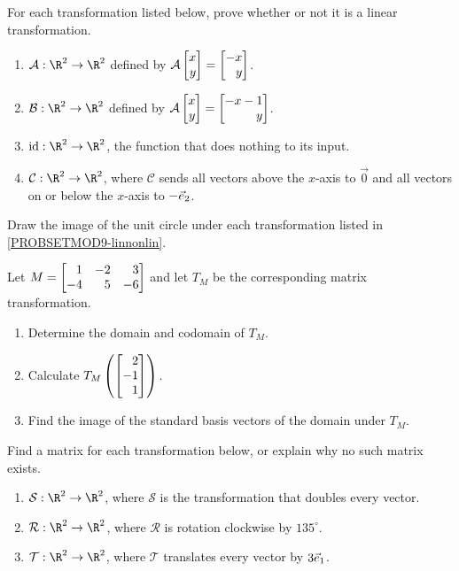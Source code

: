 \begin{exercises}
	\begin{problist}
		\prob For each transformation listed below, prove whether or not it is a linear transformation.
		\label{PROBSETMOD9-linnonlin}
		\begin{enumerate}
			\item $\mathcal A:\R^2\to\R^2$ defined by $\mathcal A\mat{x\\y}=\mat{-x\\y}$.
			\item $\mathcal B:\R^2\to\R^2$ defined by $\mathcal A\mat{x\\y}=\mat{-x-1\\y}$.
			\item $\Ident:\R^2\to\R^2$, the function that does nothing to its input.
			\item $\mathcal C:\R^2\to\R^2$, where $\mathcal C$ sends all vectors above the $x$-axis to $\vec 0$
				and all vectors on or below the $x$-axis to $-{\vec e_2}$.
		\end{enumerate}

		\prob Draw the image of the unit circle under each transformation listed in \ref{PROBSETMOD9-linnonlin}.

		\prob Let $M=\mat{1&-2&3\\-4&5&-6}$ and let $T_M$ be the corresponding matrix transformation.
		\begin{enumerate}
			\item Determine the domain and codomain of $T_M$.
			\item Calculate $T_M\left(\mat{2\\-1\\1}\right)$.
			\item Find the image of the standard basis vectors of the domain under $T_M$.
		\end{enumerate}

		\prob Find a matrix for each transformation below, or explain why no such matrix exists.
		\begin{enumerate}
			\item $\mathcal S:\R^{2}\to\R^{2}$, where $\mathcal S$ is the
				transformation that doubles every vector.

			\item $\mathcal R:\R^{2}\to\R^{2}$, where $\mathcal R$
				is rotation clockwise by $135^{\circ}$.

			\item $\mathcal T:\R^2\to\R^2$, where $\mathcal T$ translates every vector by $3{\vec e_1}$.


\end{enumerate}
\end{problist}
\end{exercises}
